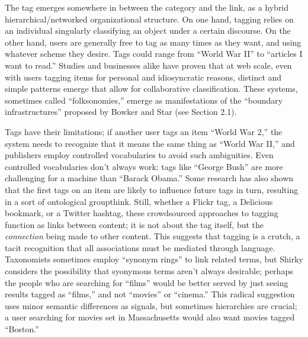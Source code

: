 The tag emerges somewhere in between the category and the link, as a hybrid hierarchical/networked organizational structure. On one hand, tagging relies on an individual singularly classifying an object under a certain discourse. On the other hand, users are generally free to tag as many times as they want, and using whatever scheme they desire. Tags could range from ``World War II'' to ``articles I want to read.'' Studies and businesses alike have proven that at web scale, even with users tagging items for personal and idiosyncratic reasons, distinct and simple patterns emerge that allow for collaborative classification.\autocite{cattuto_semiotic_2007} These systems, sometimes called ``folksonomies,'' emerge as manifestations of the ``boundary infrastructures'' proposed by Bowker and Star (see Section 2.1).\autocite{bowker_sorting_2000}

Tags have their limitations; if another user tags an item ``World War 2,'' the system needs to recognize that it means the same thing as ``World War II,'' and publishers employ controlled vocabularies to avoid such ambiguities. Even controlled vocabularies don't always work: tags like ``George Bush'' are more challenging for a machine than ``Barack Obama.'' Some research has also shown that the first tags on an item are likely to influence future tags in turn, resulting in a sort of ontological groupthink.\autocite{cattuto_semiotic_2007} Still, whether a Flickr tag, a Delicious bookmark, or a Twitter hashtag, these crowdsourced approaches to tagging function as links between content; it is not about the tag itself, but the \emph{connection} being made to other content. This suggests that tagging is a crutch, a tacit recognition that all associations must be mediated through language. Taxonomists sometimes employ ``synonym rings'' to link related terms, but Shirky considers the possibility that syonymous terms aren't always desirable; perhaps the people who are searching for ``films'' would be better served by just seeing results tagged as ``films,'' and not ``movies'' or ``cinema.''\autocite{shirky_ontology_2005} This radical suggestion uses minor semantic differences as signals, but sometimes hierarchies are crucial; a user searching for movies set in Massachusetts would also want movies tagged ``Boston.''

